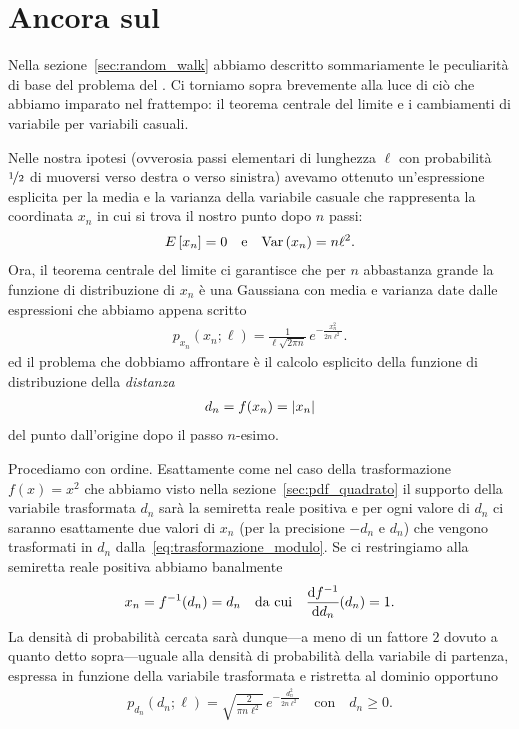 \section{Ancora sul }

Nella sezione~\ref{sec:random_walk} abbiamo descritto sommariamente le
peculiarità di base del problema del . Ci torniamo sopra
brevemente alla luce di ciò che abbiamo imparato nel frattempo: il teorema
centrale del limite e i cambiamenti di variabile per variabili casuali.

Nelle nostra ipotesi (ovverosia passi elementari di lunghezza $\ell$ con
probabilità $\nicefrac{1}{2}$ di muoversi verso destra o verso sinistra)
avevamo ottenuto un'espressione esplicita per la media e la varianza della
variabile casuale che rappresenta la coordinata $x_n$ in cui si trova il nostro
punto dopo $n$ passi:
\begin{align*}
  \displaystyle E\left[x_n\right] = 0 \quad \text{e} \quad \text{Var}\left(x_n\right) = n\ell^2.
\end{align*}
Ora, il teorema centrale del limite ci garantisce che per $n$ abbastanza
grande la funzione di distribuzione di $x_n$ è una Gaussiana con media e
varianza date dalle espressioni che abbiamo appena scritto
\begin{align*}
  p_{x_n}(x_n; \ell) = \frac{1}{\ell\sqrt{2\pi n}} \, e^{-\frac{x_n^2}{2n\ell^2}}.
\end{align*}
ed il problema che dobbiamo affrontare è il calcolo esplicito della
funzione di distribuzione della \emph{distanza}
\begin{align}\label{eq:trasformazione_modulo}
  d_n = f(x_n) = \left| x_n \right|
\end{align}
del punto dall'origine dopo il passo $n$-esimo.

Procediamo con ordine. Esattamente come nel caso della trasformazione
$f(x) = x^2$ che abbiamo visto nella sezione~\ref{sec:pdf_quadrato} il supporto
della variabile trasformata $d_n$ sarà la semiretta reale positiva e per
ogni valore di $d_n$ ci saranno esattamente due valori di $x_n$ (per la
precisione $-d_n$ e $d_n$) che vengono trasformati in $d_n$
dalla~\eqref{eq:trasformazione_modulo}. Se ci restringiamo alla semiretta reale
positiva abbiamo banalmente
\begin{align*}
  x_n = f^{-1}(d_n) = d_n \quad \text{da cui} \quad
  \td{f^{-1}}{d_n}{d_n} = 1.
\end{align*}
La densità di probabilità cercata sarà dunque---a meno di un fattore $2$
dovuto a quanto detto sopra---uguale alla densità di probabilità della
variabile di partenza, espressa in funzione della variabile trasformata e
ristretta al dominio opportuno
\begin{align}
  p_{d_n}(d_n; \ell) = \sqrt{\frac{2}{\pi n\ell^2}} \, e^{-\frac{d_n^2}{2n\ell^2}}
  \quad \text{con} \quad d_n \geq 0.
\end{align}

